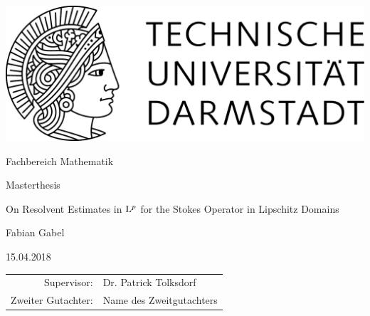 \begin{titlepage}
  \begin{center}
    \includegraphics[width=0.5\linewidth]{TU_Darmstadt_Logo.pdf}
    \vfill
    
    \large{Fachbereich Mathematik}
    \vfill
    
    \large{Masterthesis}
    \vfill

    \huge{On Resolvent Estimates in $\mathrm{L}^p$ for the Stokes Operator in Lipschitz Domains}
    \vfill
    
		\large
    Fabian Gabel

    \large 15.04.2018
    \vfill
\begin{tabular}{rl}
    Supervisor:& Dr. Patrick Tolksdorf
    \\
    Zweiter Gutachter:& Name des Zweitgutachters
\end{tabular}
  \end{center}
\end{titlepage}
